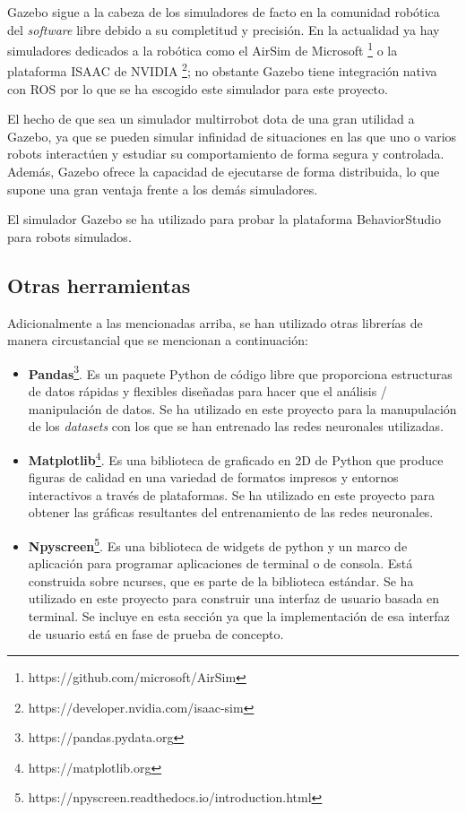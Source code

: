 Gazebo sigue a la cabeza de los simuladores de facto en la comunidad robótica del \textit{software} libre debido a su completitud y precisión. En la actualidad ya hay simuladores dedicados a la robótica como el AirSim de Microsoft \footnote{https://github.com/microsoft/AirSim} o la plataforma ISAAC de NVIDIA \footnote{https://developer.nvidia.com/isaac-sim}; no obstante Gazebo tiene integración nativa con ROS por lo que se ha escogido este simulador para este proyecto.

El hecho de que sea un simulador multirrobot dota de una gran utilidad a Gazebo, ya que se pueden simular infinidad de situaciones en las que uno o varios robots interactúen y estudiar su comportamiento de forma segura y controlada. Además, Gazebo ofrece la capacidad de ejecutarse de forma distribuida, lo que supone una gran ventaja frente a los demás simuladores.

El simulador Gazebo se ha utilizado para probar la plataforma BehaviorStudio para robots simulados.


\subsection{Otras herramientas}

Adicionalmente a las mencionadas arriba, se han utilizado otras librerías de manera circustancial que se mencionan a continuación:

\begin{itemize}
    \item \textbf{Pandas}\footnote{https://pandas.pydata.org}. Es un paquete Python de código libre que proporciona estructuras de datos rápidas y flexibles diseñadas para hacer que el  análisis / manipulación de datos. Se ha utilizado en este proyecto para la manupulación de los \textit{datasets} con los que se han entrenado las redes neuronales utilizadas.
    \item \textbf{Matplotlib}\footnote{https://matplotlib.org}. Es una biblioteca de graficado en 2D de Python que produce figuras de calidad en una variedad de formatos impresos y entornos interactivos a través de plataformas. Se ha utilizado en este proyecto para obtener las gráficas resultantes del entrenamiento de las redes neuronales.
    \item \textbf{Npyscreen}\footnote{https://npyscreen.readthedocs.io/introduction.html}. Es una biblioteca de widgets de python y un marco de aplicación para programar aplicaciones de terminal o de consola. Está construida sobre ncurses, que es parte de la biblioteca estándar. Se ha utilizado en este proyecto para construir una interfaz de usuario basada en terminal. Se incluye en esta sección ya que la implementación de esa interfaz de usuario está en fase de prueba de concepto.
\end{itemize}



